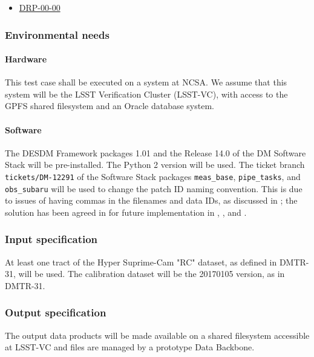 \begin{itemize}

  \item{\hyperref[drp-00-00]{DRP-00-00}}

\end{itemize}

\subsubsection{Environmental needs}

\paragraph{Hardware}

This test case shall be executed on a system at NCSA.
We assume that this system will be the LSST Verification Cluster (LSST-VC),
with access to the GPFS shared filesystem and an Oracle database system.

\paragraph{Software}\label{sec:software}

The DESDM Framework packages 1.01 and the Release 14.0 of the DM Software Stack will be pre-installed. The Python 2 version will be used.
The ticket branch \texttt{tickets/DM-12291} of the Software Stack packages \texttt{meas{\_}base}, \texttt{pipe{\_}tasks}, and \texttt{obs{\_}subaru} will be used to change the patch ID naming convention.
This is due to issues of having commas in the filenames and data IDs, as discussed in ; the solution has been agreed in  for future implementation in , , and .

\subsubsection{Input specification}\label{sec:input}

At least one tract of the Hyper Suprime-Cam "RC" dataset, as defined in DMTR-31, will be used.
The calibration dataset will be the 20170105 version, as in DMTR-31.


\subsubsection{Output specification}

The output data products will be made available on a shared filesystem accessible at LSST-VC and files are managed by a prototype Data Backbone.

